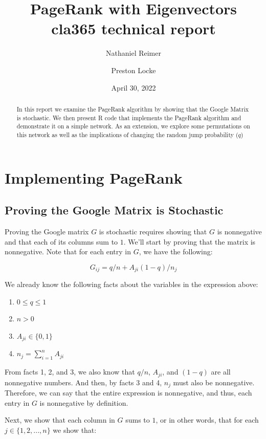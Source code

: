 \documentclass{article}
\title{{\sffamily PageRank with Eigenvectors} \\ 
{\sc cla365 technical report }}
\author{Nathaniel Reimer \and Preston Locke}
\date{April 30, 2022}
\begin{document}
\maketitle

\begin{abstract} 
\noindent
In this report we examine the PageRank algorithm by showing that the Google Matrix is stochastic. We then present R code that implements the PageRank algorithm and demonstrate it on a simple network. As an extension, we explore some permutations on this network as well as the implications of changing the random jump probability ($q$)
\end{abstract}


\section{Implementing PageRank}

\subsection{Proving the Google Matrix is Stochastic}


Proving the Google matrix $G$ is stochastic requires showing that $G$ is nonnegative
and that each of its columns sum to $1$. We'll start by proving that the matrix is
nonnegative. Note that for each entry in $G$, we have the following:

$$
G_{ij} = q/n + A_{ji} (1 - q) / n_j
$$

We already know the following facts about the variables in the expression above:

\begin{enumerate}
    \item $0 \leq q \leq 1$
    \item $n > 0$
    \item $A_{ji} \in \{0,1\}$
    \item $n_j = \sum_{i=1}^n A_{ji}$
\end{enumerate}

From facts 1, 2, and 3, we also know that $q/n$, $A_{ji}$, and $(1 - q)$ are all
nonnegative numbers. And then, by facts 3 and 4, $n_j$ must also be nonnegative. Therefore,
we can say that the entire expression is nonnegative, and thus, each entry in $G$ is
nonnegative by definition.

Next, we show that each column in $G$ sums to $1$, or in other words, that for each
$j \in \{ 1, 2, ..., n\}$ we show that:
\end{document}
